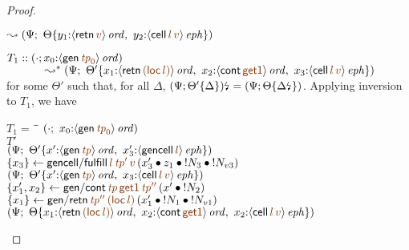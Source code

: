 \begin{proof}
\begin{description}
\qquad\qquad
  $\leadsto \left(\Psi; ~
   \tackon{\Theta}
    {y_1{:}\istrue{\susp{{\sf retn}\,\lf{v}}}, ~
     y_2{:}\iseph{\susp{{\sf cell}\,\lf{l}\,\lf{v}}}
    }\right)$

   \medskip
   $T_1 :: (\cdot; x_0{:}\istrue{\susp{{\sf gen}\,\lf{{\it tp}_0}}}) $\\
    $ ~ \quad\qquad\leadsto^* \left(\Psi; ~
     \tackon{\Theta'}{x_1{:}\istrue{\susp{{\sf retn}\,\lf{({\sf loc}\,l)}}}, ~ 
     x_2{:}\istrue{\susp{{\sf cont}\,\lf{{\sf get1}}}}, ~
     x_3{:}\iseph{\susp{{\sf cell}\,\lf{l}\,\lf{v}}}
    }
     \right)$ \\
   for some $\Theta'$ such that, for all $\Delta$,
   ${(\Psi; {\Theta'}\{{\Delta}\})}{\mbox{\lightning}}_{} = (\Psi;
   {\Theta}\{{{\Delta}{\mbox{\lightning}}_{}}\})$. Applying 
   inversion to $T_1$, we have

   \medskip

\begin{tabbing}
$T_1 = ~$ \= \qquad \= 
    $(\cdot; ~ x_0{:}\istrue{\susp{{\sf gen}\,\lf{{\it tp}_0}}})$
\\
\>$T'$
\\
\>\> $\left(\Psi; ~
       \tackon{\Theta'}
       {x'{:}\istrue{\susp{{\sf gen}\,\lf{{\it tp}}}}, ~
        x_3'{:}\iseph{\susp{{\sf gencell}\,\lf{l}}}
       }\right)$
\\
\>$\trstep{x_3}{{\sf gencell/fulfill}\,\lf{l}\,\lf{{\it tp}'}\,\lf{v}\,
      (\tfuser{x_3'}{\tfuser{z_1}{\tfuser{\tbangr{N_3}}{\tbangr{N_{v3}}}}})}$
\\
\>\> $\left(\Psi; ~
       \tackon{\Theta'}
       {x'{:}\istrue{\susp{{\sf gen}\,\lf{{\it tp}}}}, ~
        x_3{:}\iseph{\susp{{\sf cell}\,\lf{l}\,\lf{v}}}
       }\right)$
\\
\>$\trstep{x_1',x_2}{{\sf gen/cont}\,
     \lf{{\it tp}}\,\lf{{\sf get1}}\,\lf{{\it tp}''}\,
     (\tfuser{x'}{\tbangr{N_2}})}$
\\
\>$\trstep{x_1}{{\sf gen/retn}\,\lf{{\it tp}''}\,\lf{({\sf loc}\,l)}\,
     (\tfuser{x_1'}{\tfuser{\tbangr{N_1}}{\tbangr{N_{v1}}}})}$ 
\\
\>\>$\left(\Psi; ~
   \tackon{\Theta}
    {x_1{:}\istrue{\susp{{\sf retn}\,\lf{({\sf loc}\,l)}}}, ~
     x_2{:}\istrue{\susp{{\sf cont}\,\lf{{\sf get1}}}}, ~
     x_2{:}\iseph{\susp{{\sf cell}\,\lf{l}\,\lf{v}}}
    }\right)$
\end{tabbing}


\end{description}
\end{proof}
